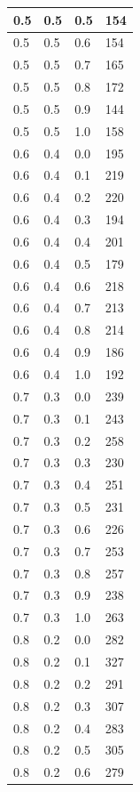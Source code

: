\documentclass{bmstu}[a4paper]
\begin{document}
\begin{longtable}{|p{}|p{}|p{}|p{}|}
	0.5 &  0.5 &  0.5 &   154 \\\hline
	0.5 &  0.5 &  0.6 &   154 \\\hline
	0.5 &  0.5 &  0.7 &   165 \\\hline
	0.5 &  0.5 &  0.8 &   172 \\\hline
	0.5 &  0.5 &  0.9 &   144 \\\hline
	0.5 &  0.5 &  1.0 &   158 \\\hline
	0.6 &  0.4 &  0.0 &   195 \\\hline
	0.6 &  0.4 &  0.1 &   219 \\\hline
	0.6 &  0.4 &  0.2 &   220 \\\hline
	0.6 &  0.4 &  0.3 &   194 \\\hline
	0.6 &  0.4 &  0.4 &   201 \\\hline
	0.6 &  0.4 &  0.5 &   179 \\\hline
	0.6 &  0.4 &  0.6 &   218 \\\hline
	0.6 &  0.4 &  0.7 &   213 \\\hline
	0.6 &  0.4 &  0.8 &   214 \\\hline
	0.6 &  0.4 &  0.9 &   186 \\\hline
	0.6 &  0.4 &  1.0 &   192 \\\hline
	0.7 &  0.3 &  0.0 &   239 \\\hline
	0.7 &  0.3 &  0.1 &   243 \\\hline
	0.7 &  0.3 &  0.2 &   258 \\\hline
	0.7 &  0.3 &  0.3 &   230 \\\hline
	0.7 &  0.3 &  0.4 &   251 \\\hline
	0.7 &  0.3 &  0.5 &   231 \\\hline
	0.7 &  0.3 &  0.6 &   226 \\\hline
	0.7 &  0.3 &  0.7 &   253 \\\hline
	0.7 &  0.3 &  0.8 &   257 \\\hline
	0.7 &  0.3 &  0.9 &   238 \\\hline
	0.7 &  0.3 &  1.0 &   263 \\\hline
	0.8 &  0.2 &  0.0 &   282 \\\hline
	0.8 &  0.2 &  0.1 &   327 \\\hline
	0.8 &  0.2 &  0.2 &   291 \\\hline
	0.8 &  0.2 &  0.3 &   307 \\\hline
	0.8 &  0.2 &  0.4 &   283 \\\hline
	0.8 &  0.2 &  0.5 &   305 \\\hline
	0.8 &  0.2 &  0.6 &   279 \\\hline

\end{longtable}
\end{document}
